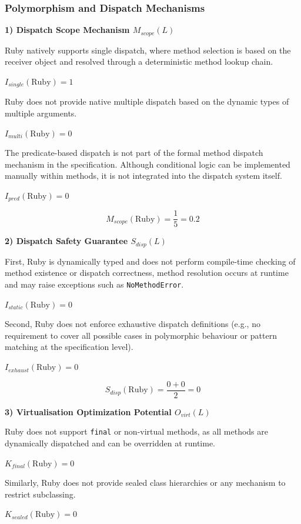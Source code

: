 \subsubsection{Polymorphism and Dispatch Mechanisms}

\textbf{1) Dispatch Scope Mechanism $M_{scope}(L)$}

Ruby natively supports single dispatch, where method selection is based on the receiver object and resolved through a deterministic method lookup chain.

$I_{single}(\text{Ruby})=1$

Ruby does not provide native multiple dispatch based on the dynamic types of multiple arguments.

$I_{multi}(\text{Ruby})=0$

The predicate-based dispatch is not part of the formal method dispatch mechanism in the specification. Although conditional logic can be implemented manually within methods, it is not integrated into the dispatch system itself.

$I_{pred}(\text{Ruby})=0$

\[
    M_{scope}(\text{Ruby}) = \frac{1}{5} = 0.2
\]

\textbf{2) Dispatch Safety Guarantee $S_{disp}(L)$}

First, Ruby is dynamically typed and does not perform compile-time checking of method existence or dispatch correctness, method resolution occurs at runtime and may raise exceptions such as \texttt{NoMethodError}.

$I_{static}(\text{Ruby})=0$ 

Second, Ruby does not enforce exhaustive dispatch definitions (e.g., no requirement to cover all possible cases in polymorphic behaviour or pattern matching at the specification level).

$I_{exhaust}(\text{Ruby})=0$

\[
    S_{disp}(\text{Ruby})=\frac{0+0}{2}=0
\]

\textbf{3) Virtualisation Optimization Potential $O_{virt}(L)$}

Ruby does not support \texttt{final} or non-virtual methods, as all methods are dynamically dispatched and can be overridden at runtime.

$K_{final}(\text{Ruby})=0$

Similarly, Ruby does not provide sealed class hierarchies or any mechanism to restrict subclassing.

$K_{sealed}(\text{Ruby})=0$

